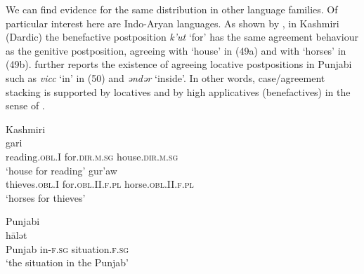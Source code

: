 \documentclass[output=paper]{langsci/langscibook}
\begin{document}
We can find evidence for the same distribution in other language families. Of particular interest here are Indo-Aryan languages. As shown by \citet{Payne1995}, in Kashmiri (Dardic) the benefactive postposition \textit{k’ut} ‘for’ has the same agreement behaviour as the genitive postposition, agreeing with ‘house’ in (49a) and with ‘horses’ in (49b). \citet{Payne1995} further reports the existence of agreeing locative postpositions in Punjabi such as \textit{vicc} ‘in’ in (50) and \textit{ənd}\textit{ər} ‘inside’. In other words, case/agreement stacking is supported by locatives and by high applicatives (benefactives) in the sense of \citet{Pylkkänen2008}.

\ea%
    Kashmiri \citep[293]{Payne1995}\label{ex:manzini:49}\\
    \ea
    \gll\relax [paranas     k'ut]     gari \\
         reading.\textsc{obl}.I   for.\textsc{dir.m.sg}  house.\textsc{dir.m.sg}\\
    \glt ‘house for reading’  
    \ex  
    \gll\relax [cur'an     k'it'aw]     gur'aw\\
         thieves.\textsc{obl}.I   for.\textsc{obl}.II.\textsc{f.pl}   horse.\textsc{obl.II.f.pl}\\
    \glt ‘horses for thieves’
    \z
\z

          

    

\ea%
         Punjabi \citep[289]{Payne1995}\label{ex:manzini:50}\\
    \gll [pənj\=ab  vicl-\=\i]    h\=alət        \\
         Punjab   in-\textsc{f.sg}  situation.\textsc{f.sg}\\
    \glt ‘the situation in the Punjab’ 
    \z
\end{document}
